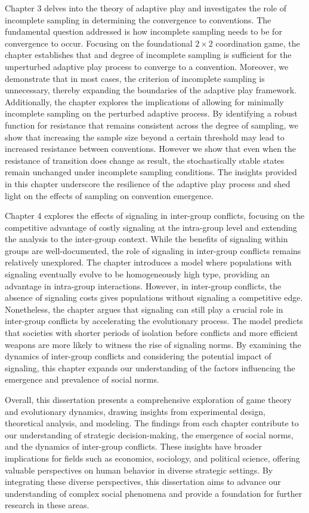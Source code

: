 Chapter 3 delves into the theory of adaptive play and investigates the role of incomplete sampling in determining the convergence to conventions. The fundamental question addressed is how incomplete sampling needs to be for convergence to occur. Focusing on the foundational $2\times 2$ coordination game, the chapter establishes that and degree of incomplete sampling is sufficient for the unperturbed adaptive play process to converge to a convention. Moreover, we demonstrate that in most cases, the criterion of incomplete sampling is unnecessary, thereby expanding the boundaries of the adaptive play framework. Additionally, the chapter explores the implications of allowing for minimally incomplete sampling on the perturbed adaptive process. By identifying a robust function for resistance that remains consistent across the degree of sampling, we show that increasing the sample size beyond a certain threshold may lead to increased resistance between conventions. However we show that even when the resistance of transition does change as result, the stochastically stable states remain unchanged under incomplete sampling conditions. The insights provided in this chapter underscore the resilience of the adaptive play process and shed light on the effects of sampling on convention emergence.

Chapter 4 explores the effects of signaling in inter-group conflicts, focusing on the competitive advantage of costly signaling at the intra-group level and extending the analysis to the inter-group context. While the benefits of signaling within groups are well-documented, the role of signaling in inter-group conflicts remains relatively unexplored. The chapter introduces a model where populations with signaling eventually evolve to be homogeneously high type, providing an advantage in intra-group interactions. However, in inter-group conflicts, the absence of signaling costs gives populations without signaling a competitive edge. Nonetheless, the chapter argues that signaling can still play a crucial role in inter-group conflicts by accelerating the evolutionary process. The model predicts that societies with shorter periods of isolation before conflicts and more efficient weapons are more likely to witness the rise of signaling norms. By examining the dynamics of inter-group conflicts and considering the potential impact of signaling, this chapter expands our understanding of the factors influencing the emergence and prevalence of social norms.

Overall, this dissertation presents a comprehensive exploration of game theory and evolutionary dynamics, drawing insights from experimental design, theoretical analysis, and modeling. The findings from each chapter contribute to our understanding of strategic decision-making, the emergence of social norms, and the dynamics of inter-group conflicts. These insights have broader implications for fields such as economics, sociology, and political science, offering valuable perspectives on human behavior in diverse strategic settings. By integrating these diverse perspectives, this dissertation aims to advance our understanding of complex social phenomena and provide a foundation for further research in these areas.

